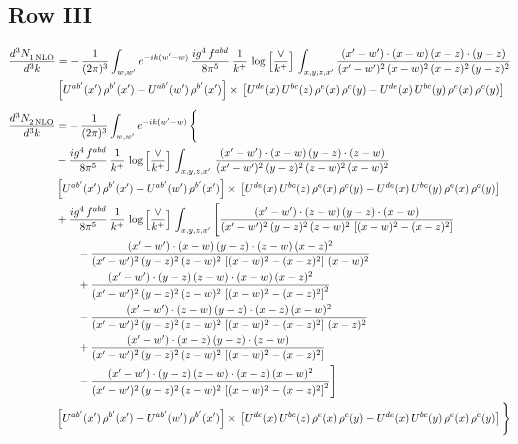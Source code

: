 \documentclass[9pt]{article}
\numberwithin{equation}{section}
\begin{document}
\subsection{Row III}
\begin{align}
   \frac{d^{3}N_{1\,\rm NLO}^{\rm}}{d^{3}k}  & = -\,\frac{1}{(2\pi)^{3}}  \int_{w, w^\prime} e^{-ik(w^\prime-w)}\,\frac{ig^{4}\,f^{abd}}{8\pi^{5}}\,\frac{1}{k^{+}}\,\log{\left[\frac{\vee}{k^{+}}\right]}\,\int_{x,y,z,x'}\frac{(x'-w')\cdot (x-w)\, (x-z)\cdot (y-z)}{(x'-w')^{2}\, (x-w)^{2}\, (x-z)^{2}\, (y-z)^{2}}\notag \\ & \left[U^{ab'}(x')\,\rho^{b'}(x')-U^{ab'}(w')\, \rho^{b'}(x')\right]\times\, \left[U^{de}(x)\,U^{bc}(z)\, \rho^{e}(x)\,\rho^{c}(y)-U^{de}(x)\,U^{bc}(y)\,\rho^{e}(x)\,\rho^{c}(y)\right]
\end{align}
\begin{align}
   \frac{d^{3}N_{2\,\rm NLO}^{\rm}}{d^{3}k}  & = -\,\frac{1}{(2\pi)^{3}}  \int_{w, w^\prime} e^{-ik(w^\prime-w)}\, \Bigg\{\notag \\ &  -\frac{ig^{4}\, f^{abd}}{8\pi^{5}}\, \frac{1}{k^{+}}\, \log{\left[\frac{\vee}{ k^{+}}\right]}\,\int_{x,y,z,x'}\,\frac{(x'-w')\cdot (x-w)\, (y-z)\cdot (z-w)}{(x'-w')^{2}\, (y-z)^{2}\, (z-w)^{2}\,(x-w)^{2}}\, \notag \\ & \left[U^{ab'}(x')\,\rho^{b'}(x')-U^{ab'}(w')\, \rho^{b'}(x')\right]\times\,\left[U^{de}(x)\,U^{bc}(z)\, \rho^{e}(x)\,\rho^{c}(y)-U^{de}(x)\,U^{bc}(y)\,\rho^{e}(x)\,\rho^{c}(y)\right]\notag \\ & +\frac{ig^{4}\, f^{abd}}{8\pi^{5}}\, \frac{1}{k^{+}}\,\log{\left[\frac{\vee}{k^{+}}\right]}\,\int_{x,y,z,x'}\Bigg[\frac{(x'-w')\cdot (z-w)\, (y-z)\cdot (x-w)}{(x'-w')^{2}\, (y-z)^{2}\, (z-w)^{2}\,\left[(x-w)^{2}-(x-z)^{2}\right]}\notag \\ & \qquad-\frac{(x'-w')\cdot (x-w)\, (y-z)\cdot (z-w)\,(x-z)^{2}}{(x'-w')^{2}\, (y-z)^{2}\, (z-w)^{2}\,\left[(x-w)^{2}-(x-z)^{2}\right]\,(x-w)^{2}}\notag \\ & \qquad+\frac{(x'-w')\cdot (y-z)\, (z-w)\cdot (x-w)\,(x-z)^{2}}{(x'-w')^{2}\, (y-z)^{2}\, (z-w)^{2}\,\left[(x-w)^{2}-(x-z)^{2}\right]^{2}}\notag \\ & \qquad-\frac{(x'-w')\cdot (z-w)\, (y-z)\cdot (x-z)\,(x-w)^{2}}{(x'-w')^{2}\, (y-z)^{2}\, (z-w)^{2}\,\left[(x-w)^{2}-(x-z)^{2}\right]\,(x-z)^{2}}\notag \\ & \qquad+\frac{(x'-w')\cdot (x-z)\, (y-z)\cdot (z-w)}{(x'-w')^{2}\, (y-z)^{2}\, (z-w)^{2}\,\left[(x-w)^{2}-(x-z)^{2}\right]}\notag \\ & \qquad-\frac{(x'-w')\cdot (y-z)\, (z-w)\cdot (x-z)\,(x-w)^{2}}{(x'-w')^{2}\, (y-z)^{2}\, (z-w)^{2}\,\left[(x-w)^{2}-(x-z)^{2}\right]^{2}}\Bigg]\notag \\ & \left[U^{ab'}(x')\,\rho^{b'}(x')-U^{ab'}(w')\, \rho^{b'}(x')\right]\times\, \left[U^{de}(x)\,U^{bc}(z)\, \rho^{e}(x)\,\rho^{c}(y)-U^{de}(x)\,U^{bc}(y)\,\rho^{e}(x)\,\rho^{c}(y)\right]\Bigg\} 
\end{align}   
\end{document}
